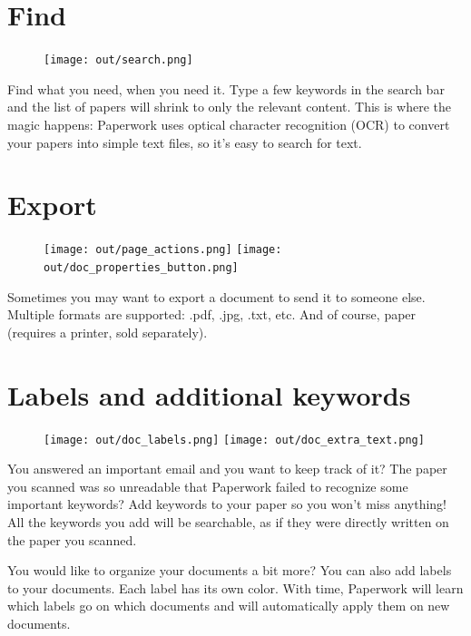 \documentclass[10pt,a4paper]{article}
\begin{document}
\section{Find}

\begin{figure}
	\centering
	\vspace{-20pt}
	\texttt{[image: out/search.png]}
\end{figure}

Find what you need, when you need it. Type a few keywords in the search
bar and the list of papers will shrink to only the relevant content. This
is where the magic happens: Paperwork uses optical character recognition
(OCR) to convert your papers into simple text files, so it's easy to
search for text.


\section{Export}

\begin{figure}[h]
	\centering
	\texttt{[image: out/page\_actions.png]}
	\texttt{[image: out/doc\_properties\_button.png]}
\end{figure}

Sometimes you may want to export a document to send it to someone else.
Multiple formats are supported: .pdf, .jpg, .txt, etc. And of course, paper
(requires a printer, sold separately).


\section{Labels and additional keywords}

\begin{figure}[h]
	\centering
	\texttt{[image: out/doc\_labels.png]}
	\texttt{[image: out/doc\_extra\_text.png]}
\end{figure}

You answered an important email and you want to keep track of it? The paper
you scanned was so unreadable that Paperwork failed to recognize some
important keywords? Add keywords to your paper so you won't miss anything! All
the keywords you add will be searchable, as if they were directly written on
the paper you scanned.

You would like to organize your documents a bit more? You can also add labels
to your documents. Each label has its own color. With time, Paperwork will
learn which labels go on which documents and will automatically apply them
on new documents.
\end{document}
